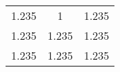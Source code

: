 \begin{table}
    \centering
    \begin{tabular}{ccc}
        \toprule
        1.235 & 1 & 1.235 \\
        1.235 & 1.235 & 1.235 \\
        1.235 & 1.235 & 1.235 \\
        \bottomrule
    \end{tabular}
\end{table}
